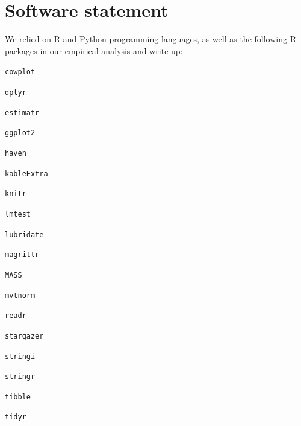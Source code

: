 \documentclass[
  12pt,
]{article}
\begin{document}
\clearpage

\hypertarget{software-statement}{%
\section{Software statement}\label{software-statement}}

We relied on R \citep{R2020} and Python \citep{VanRossum2009} programming languages, as well as the following R packages in our empirical analysis and write-up:

\texttt{cowplot} \citep{Wilke2020}

\texttt{dplyr} \citep{Wickham2020a}

\texttt{estimatr} \citep{Blair2021}

\texttt{ggplot2} \citep{Wickham2016}

\texttt{haven} \citep{Wickham2020c}

\texttt{kableExtra} \citep{Zhu2020}

\texttt{knitr} \citep{Xie2020}

\texttt{lmtest} \citep{Zeileis2002}

\texttt{lubridate} \citep{Grolemund2011}

\texttt{magrittr} \citep{Bache2014}

\texttt{MASS} \citep{Venables2002}

\texttt{mvtnorm} \citep{Genz2009}

\texttt{readr} \citep{Wickham2018}

\texttt{stargazer} \citep{Hlavac2018}

\texttt{stringi} \citep{Gagolewski2018}

\texttt{stringr} \citep{Wickham2019}

\texttt{tibble} \citep{Muller2018}

\texttt{tidyr} \citep{Wickham2020b}

\clearpage

\renewcommand\refname{References}
  
\end{document}
